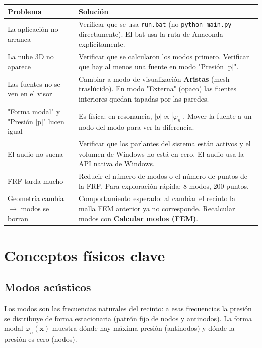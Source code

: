 \documentclass[11pt, a4paper]{article}
\newcommand{\menu}[1]{\textbf{\guillemotleft #1\guillemotright}}
\begin{document}
\begin{tabular}{p{5cm}p{8.5cm}}
  \toprule
  Problema & Solución \\
  \midrule
  La aplicación no arranca &
    Verificar que se usa \texttt{run.bat} (no \texttt{python main.py}
    directamente). El bat usa la ruta de Anaconda explícitamente. \\
  \addlinespace
  La nube 3D no aparece &
    Verificar que se calcularon los modos primero. Verificar que hay
    al menos una fuente en modo "Presión |p|". \\
  \addlinespace
  Las fuentes no se ven en el visor &
    Cambiar a modo de visualización \textbf{Aristas} (mesh traslúcido).
    En modo "Externa" (opaco) las fuentes interiores quedan tapadas por
    las paredes. \\
  \addlinespace
  "Forma modal" y "Presión |p|" lucen igual &
    Es física: en resonancia, $|p| \propto |\varphi_n|$. Mover la fuente
    a un nodo del modo para ver la diferencia. \\
  \addlinespace
  El audio no suena &
    Verificar que los parlantes del sistema están activos y el volumen de
    Windows no está en cero. El audio usa la API nativa de Windows. \\
  \addlinespace
  FRF tarda mucho &
    Reducir el número de modos o el número de puntos de la FRF. Para
    exploración rápida: 8 modos, 200 puntos. \\
  \addlinespace
  Geometría cambia $\to$ modos se borran &
    Comportamiento esperado: al cambiar el recinto la malla FEM anterior
    ya no corresponde. Recalcular modos con \menu{Calcular modos (FEM)}. \\
  \bottomrule
\end{tabular}

\section{Conceptos físicos clave}

\subsection{Modos acústicos}

Los modos son las frecuencias naturales del recinto: a esas frecuencias la
presión se distribuye de forma estacionaria (patrón fijo de nodos y antinodos).
La forma modal $\varphi_n(\mathbf{x})$ muestra dónde hay máxima presión (antinodos)
y dónde la presión es cero (nodos).
\end{document}
